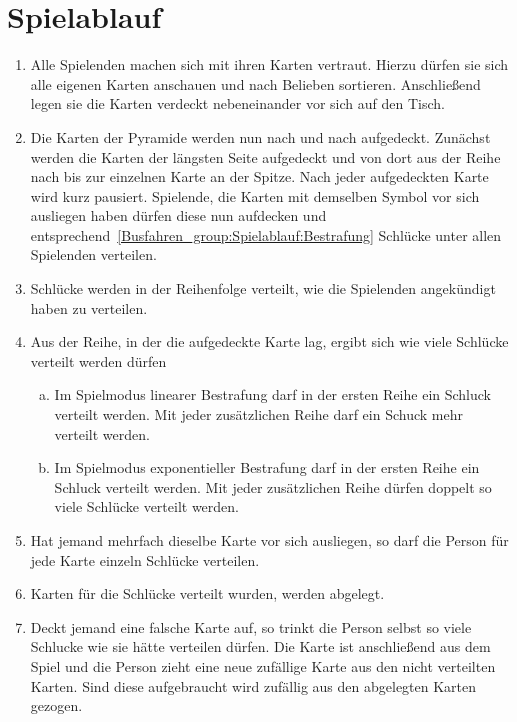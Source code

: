 \section{Spielablauf}
\begin{enumerate}[label={(\arabic*)}]
\item
Alle Spielenden machen sich mit ihren Karten vertraut.
Hierzu dürfen sie sich alle eigenen Karten anschauen und nach Belieben sortieren.
Anschließend legen sie die Karten verdeckt nebeneinander vor sich auf den Tisch.

\item
Die Karten der Pyramide werden nun nach und nach aufgedeckt.
Zunächst werden die Karten der längsten Seite aufgedeckt und von dort aus der Reihe nach bis zur einzelnen Karte an der Spitze.
Nach jeder aufgedeckten Karte wird kurz pausiert.
Spielende, die Karten mit demselben Symbol vor sich ausliegen haben dürfen diese nun aufdecken und entsprechend~\ref{Busfahren_group:Spielablauf:Bestrafung} Schlücke unter allen Spielenden verteilen.

\item Schlücke werden in der Reihenfolge verteilt, wie die Spielenden angekündigt haben zu verteilen.

\item\label{Busfahren_group:Spielablauf:Bestrafung}
Aus der Reihe, in der die aufgedeckte Karte lag, ergibt sich wie viele Schlücke verteilt werden dürfen
\begin{enumerate}[a.]
    \item \label{Busfahren_group:Spielablauf:Bestrafung:linear}
    Im Spielmodus linearer Bestrafung darf in der ersten Reihe ein Schluck verteilt werden.
    Mit jeder zusätzlichen Reihe darf ein Schuck mehr verteilt werden.    
    \item \label{Busfahren_group:Spielablauf:Bestrafung:exponentiell}
    Im Spielmodus exponentieller Bestrafung darf in der ersten Reihe ein Schluck verteilt werden.
    Mit jeder zusätzlichen Reihe dürfen doppelt so viele Schlücke verteilt werden.
\end{enumerate}

\item 
Hat jemand mehrfach dieselbe Karte vor sich ausliegen, so darf die Person für jede Karte einzeln Schlücke verteilen.

\item
Karten für die Schlücke verteilt wurden, werden abgelegt.

\item\label{Busfahren_group:Spielablauf:Ziehen}
Deckt jemand eine falsche Karte auf, so trinkt die Person selbst so viele Schlucke wie sie hätte verteilen dürfen.
Die Karte ist anschließend aus dem Spiel und die Person zieht eine neue zufällige Karte aus den nicht verteilten Karten.
Sind diese aufgebraucht wird zufällig aus den abgelegten Karten gezogen.


\end{enumerate}
